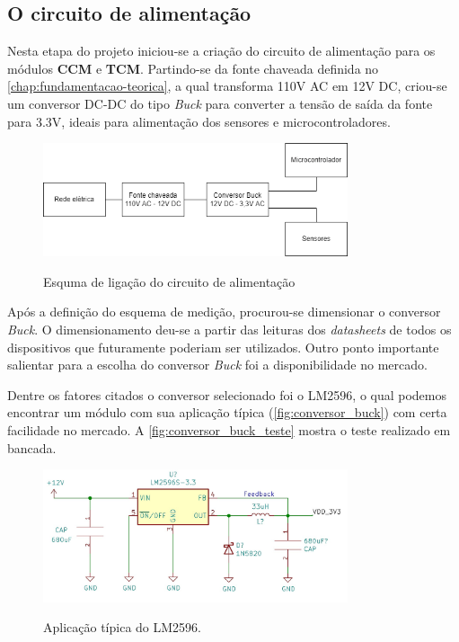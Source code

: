 \subsection{O circuito de alimentação}

Nesta etapa do projeto iniciou-se a criação do circuito de alimentação para os módulos \textbf{CCM} e \textbf{TCM}. Partindo-se da fonte chaveada definida no \autoref{chap:fundamentacao-teorica}, a qual transforma 110V AC em 12V DC, criou-se um conversor DC-DC do tipo \textit{Buck} para converter a tensão de saída da fonte para 3.3V, ideais para alimentação dos sensores e microcontroladores. 

\begin{figure}[H]
	\centering
	\caption{Esquma de ligação do circuito de alimentação}
	\includegraphics[width=0.8\textwidth]{figuras/alimentacao.png}
	\label{fig:alimentacao_esquema}
\end{figure}

Após a definição do esquema de medição, procurou-se dimensionar o conversor \textit{Buck}. O dimensionamento deu-se a partir das leituras dos \textit{datasheets} de todos os dispositivos que futuramente poderiam ser utilizados. Outro ponto importante salientar para a escolha do conversor \textit{Buck} foi a disponibilidade no mercado.

Dentre os fatores citados o conversor selecionado foi o LM2596, o qual podemos encontrar um módulo com sua aplicação típica (\autoref{fig:conversor_buck}) com certa facilidade no mercado. A \autoref{fig:conversor_buck_teste} mostra o teste realizado em bancada.

\begin{figure}[H]
	\centering
	\caption{Aplicação típica do LM2596.}
	\includegraphics[width=0.8\textwidth]{figuras/conversor_buck.jpg}
	\label{fig:conversor_buck}
\end{figure}

